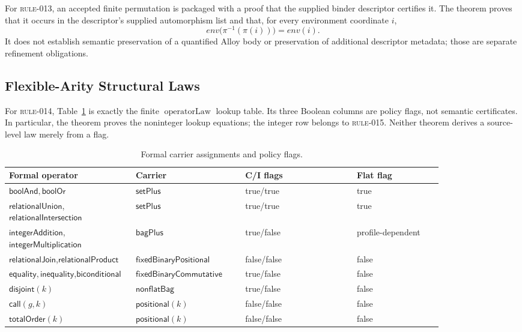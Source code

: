 For \textsc{rule-013}, an accepted finite permutation is packaged with a proof
that the supplied binder descriptor certifies it.  The theorem proves that it
occurs in the descriptor's supplied automorphism list and that, for every
environment coordinate $i$,
\[
  \mathit{env}\bigl(\pi^{-1}(\pi(i))\bigr)=\mathit{env}(i).
\]
It does not establish semantic preservation of a quantified Alloy body or
preservation of additional descriptor metadata; those are separate refinement
obligations.

\subsection{Flexible-Arity Structural Laws}

For \textsc{rule-014}, Table~\ref{tab:operator-laws} is exactly the finite
$\operatorname{operatorLaw}$ lookup table.  Its three Boolean columns are
policy flags, not semantic certificates.  In particular, the theorem proves
the noninteger lookup equations; the integer row belongs to
\textsc{rule-015}.  Neither theorem derives a source-level law merely from a
flag.

\begin{table}[t]
\centering
\footnotesize
\caption{Formal carrier assignments and policy flags.}
\label{tab:operator-laws}
\setlength{\tabcolsep}{4pt}
\begin{tabular}{p{0.25\linewidth}p{0.20\linewidth}p{0.22\linewidth}p{0.17\linewidth}}
\hline
Formal operator & Carrier & C/I flags & Flat flag\\
\hline
$\mathsf{boolAnd},\mathsf{boolOr}$ & $\mathsf{setPlus}$ & true/true & true\\
$\mathsf{relationalUnion}$,\newline $\mathsf{relationalIntersection}$ & $\mathsf{setPlus}$ & true/true & true\\
$\mathsf{integerAddition}$,\newline $\mathsf{integerMultiplication}$ & $\mathsf{bagPlus}$ & true/false & profile-dependent\\
$\mathsf{relationalJoin}$,\newline $\mathsf{relationalProduct}$ & $\mathsf{fixedBinary}\allowbreak\mathsf{Positional}$ & false/false & false\\
$\mathsf{equality},\mathsf{inequality}$,\newline $\mathsf{biconditional}$ & $\mathsf{fixedBinary}\allowbreak\mathsf{Commutative}$ & true/false & false\\
$\mathsf{disjoint}(k)$ & $\mathsf{nonflatBag}$ & true/false & false\\
$\mathsf{call}(g,k)$ & $\mathsf{positional}(k)$ & false/false & false\\
$\mathsf{totalOrder}(k)$ & $\mathsf{positional}(k)$ & false/false & false\\
\hline
\end{tabular}
\end{table}

